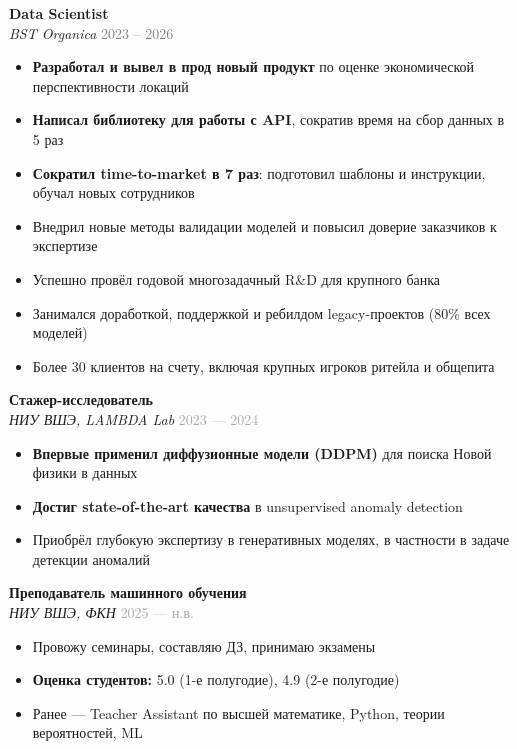 \documentclass[a4paper,10pt]{article}
\begin{document}
\textbf{Data Scientist}\\
\textit{BST Organica} \hfill \textcolor{gray}{2023 -- 2026}
\begin{itemize}
    \item \textbf{Разработал и вывел в прод новый продукт} по оценке экономической перспективности локаций
    \item \textbf{Написал библиотеку для работы с API}, сократив время на сбор данных в 5 раз
    \item \textbf{Сократил time-to-market в 7 раз}: подготовил шаблоны и инструкции, обучал новых сотрудников
    \item Внедрил новые методы валидации моделей и повысил доверие заказчиков к экспертизе
    \item Успешно провёл годовой многозадачный R\&D для крупного банка
    \item Занимался доработкой, поддержкой и ребилдом legacy-проектов (80\% всех моделей)
    \item Более 30 клиентов на счету, включая крупных игроков ритейла и общепита
\end{itemize}

\vspace{2pt}
\noindent\textbf{Стажер-исследователь}\\
\textit{НИУ ВШЭ, LAMBDA Lab} \hfill \textcolor{darkgray}{2023 — 2024} 
\begin{itemize}
    \item \textbf{Впервые применил диффузионные модели (DDPM)} для поиска Новой физики в данных
    \item \textbf{Достиг state-of-the-art качества} в unsupervised anomaly detection
    \item Приобрёл глубокую экспертизу в генеративных моделях, в частности в задаче детекции аномалий
\end{itemize}

\vspace{2pt}
\noindent\textbf{Преподаватель машинного обучения}\\
\textit{НИУ ВШЭ, ФКН} \hfill \textcolor{darkgray}{2025 — н.в.}
\begin{itemize}
    \item Провожу семинары, составляю ДЗ, принимаю экзамены
    \item \textbf{Оценка студентов:} 5.0 (1-е полугодие), 4.9 (2-е полугодие)
    \item Ранее — Teacher Assistant по высшей математике, Python, теории вероятностей, ML
\end{itemize}
\end{document}
